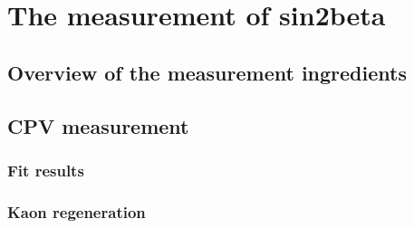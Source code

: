 
\chapter{The measurement of sin2beta}
\label{ch:measurement_of_sin2beta}

\section{Overview of the measurement ingredients}
\label{sec:measurement_of_sin2beta:overview}











\clearpage
\section{CPV measurement}
\label{sec:measurement_of_sin2beta:cpv_measurement}
\subsection{Fit results}
\label{sec:measurement_of_sin2beta:cpv_measurement:results}
\subsection{Kaon regeneration}
